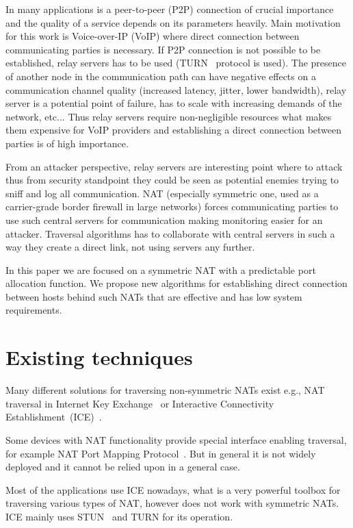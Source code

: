 \documentclass{llncs}
\newcommand{\ignore}[1]{}
\begin{document}
In many applications is a peer-to-peer (P2P) connection of crucial importance and the quality of a service depends on 
its parameters heavily. Main motivation for this work is Voice-over-IP (VoIP) where direct connection 
between communicating parties is necessary. If P2P connection is not possible to be established, relay 
servers has to be used (TURN~\citep{rfc5766} protocol is used). The presence 
of another node in the communication path can have negative effects on a communication channel quality 
(increased latency, jitter, lower bandwidth), relay server is a potential point of failure, 
has to scale with increasing demands of the network, etc...
Thus relay servers require non-negligible resources what makes them expensive for VoIP providers and
establishing a direct connection between parties is of high importance.

From an attacker perspective, relay servers are interesting point where to attack thus from security
standpoint they could be seen as potential enemies trying to sniff and log all 
communication. NAT (especially symmetric one, used as a carrier-grade border firewall in large networks)
forces communicating parties to use such central servers
for communication making monitoring easier for an attacker. Traversal algorithms has to collaborate 
with central servers in such a way they create a direct link, not using servers any further. 
% 

In this paper we are focused on a symmetric NAT with a predictable port allocation function. We propose 
new algorithms for establishing direct connection between hosts behind such NATs that are effective and 
has low system requirements.

\section{Existing techniques}
Many different solutions for traversing non-symmetric NATs exist e.g., NAT traversal in Internet Key Exchange~\citep{rfc3947} or 
Interactive Connectivity Establishment~(ICE)~\citep{rfc5245}. %

Some devices with NAT functionality provide special interface enabling traversal, for example NAT Port Mapping Protocol~\citep{rfc6886}. But in general 
it is not widely deployed and it cannot be relied upon in a general case. 

Most of the applications use ICE\ignore{~\citep{rfc5245}} nowadays, what is a very powerful toolbox for traversing 
various types of NAT, however does not work with symmetric NATs. ICE mainly uses STUN~\citep{rfc5389} and TURN\ignore{~\citep{rfc5766}} for its operation.
\end{document}
